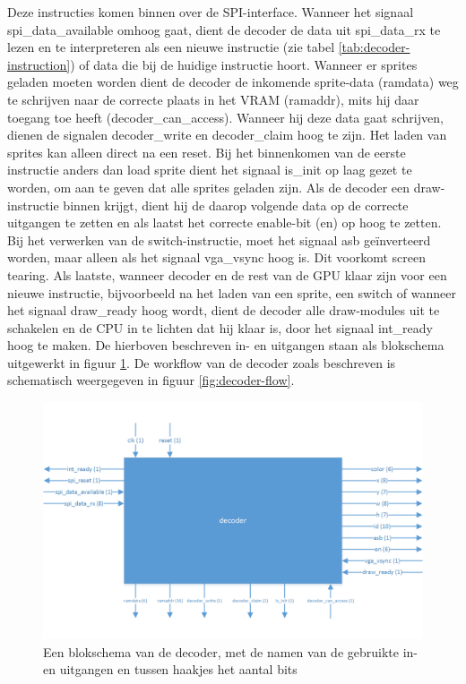 \documentclass{scrartcl} %
\begin{document}
Deze instructies komen binnen over de SPI-interface. Wanneer het signaal spi\_data\_available omhoog gaat, dient de decoder de data uit spi\_data\_rx te lezen en te interpreteren als een nieuwe instructie (zie tabel \ref{tab:decoder-instruction}) of data die bij de huidige instructie hoort.
Wanneer er sprites geladen moeten worden dient de decoder de inkomende sprite-data (ramdata) weg te schrijven naar de correcte plaats in het VRAM (ramaddr), mits hij daar toegang toe heeft (decoder\_can\_access). Wanneer hij deze data gaat schrijven, dienen de signalen decoder\_write en decoder\_claim hoog te zijn. Het laden van sprites kan alleen direct na een reset. Bij het binnenkomen van de eerste instructie anders dan load sprite dient het signaal is\_init op laag gezet te worden, om aan te geven dat alle sprites geladen zijn.
Als de decoder een draw-instructie binnen krijgt, dient hij de daarop volgende data op de correcte uitgangen te zetten en als laatst het correcte enable-bit (en) op hoog te zetten.
Bij het verwerken van de switch-instructie, moet het signaal asb geïnverteerd worden, maar alleen als het signaal vga\_vsync hoog is. Dit voorkomt screen tearing.
Als laatste, wanneer decoder en de rest van de GPU klaar zijn voor een nieuwe instructie, bijvoorbeeld na het laden van een sprite, een switch of wanneer het signaal draw\_ready hoog wordt, dient de decoder alle draw-modules uit te schakelen en de CPU in te lichten dat hij klaar is, door het signaal int\_ready hoog te maken.
De hierboven beschreven in- en uitgangen staan als blokschema uitgewerkt in figuur \ref{fig:decoder-schema}. De workflow van de decoder zoals beschreven is schematisch weergegeven in figuur \ref{fig:decoder-flow}.

\begin{figure}[H]
	\centering
	\includegraphics[width=\textwidth]{resource/decoder.png}
	\caption{Een blokschema van de decoder, met de namen van de gebruikte in- en uitgangen en tussen haakjes het aantal bits}
	\label{fig:decoder-schema}
\end{figure}
\end{document}
